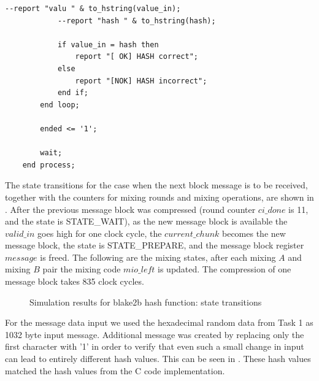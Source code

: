 \documentclass[%
	a4paper,
]
{article}
\begin{document}
\begin{lstlisting}[style = vhdl,caption = {Test bench process for verifying the hardware implementation using the reference implementation in C},label = {code:testing},]
			--report "valu " & to_hstring(value_in);
			--report "hash " & to_hstring(hash);

			if value_in = hash then
				report "[ OK] HASH correct";
			else
				report "[NOK] HASH incorrect";
			end if;
		end loop;

		ended <= '1';

		wait;
	end process;

\end{lstlisting}

The state transitions for the case when the next block message is to be received, together with the counters for mixing rounds and mixing operations, are shown in . After the previous message block was compressed (round counter $ci\_done$ is 11, and the state is STATE_WAIT), as the new message block is available the $valid\_in$ goes high for one clock cycle, the $current\_chunk$ becomes the new message block, the state is STATE_PREPARE, and the message block register $message$ is freed. The following are the mixing  states, after each mixing $A$ and mixing $B$ pair the mixing code $mio\_left$ is updated. The compression of one message block takes 835 clock cycles.

  \begin{figure}[!ht]
	\centering
	\caption{Simulation results for blake2b hash function: state transitions}
	\label{signaling}
\end{figure}

For the message data input we used the hexadecimal random data from Task 1 as 1032 byte input message. Additional  message was created by replacing only the first character with '1' in order to verify that even such a small change in input can lead to entirely different hash values. This can be seen in . These hash values matched the hash values from the C code implementation.
\end{document}
